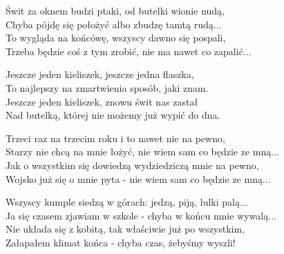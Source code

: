 \begin{text}
    Świt za oknem budzi ptaki, od butelki wionie nudą,\\
    Chyba pójdę się położyć albo zbudzę tamtą rudą...\\
    To wygląda na końcówę, wszyscy dawno się pospali,\\
    Trzeba będzie coś z tym zrobić, nie ma nawet co zapalić...

    \vin Jeszcze jeden kieliszek, jeszcze jedna flaszka,\\
    \vin To najlepszy na zmartwienia sposób, jaki znam.\\
    \vin Jeszcze jeden kieliszek, znowu świt nas zastał\\
    \vin Nad butelką, której nie możemy już wypić do dna.

    Trzeci raz na trzecim roku i to nawet nie na pewno,\\
    Starzy nie chcą na mnie łożyć, nie wiem sam co będzie ze mną...\\
    Jak o wszystkim się dowiedzą wydziedziczą mnie na pewno,\\
    Wojsko już się o mnie pyta - nie wiem sam co będzie ze mną...

    Wszyscy kumple siedzą w górach: jedzą, piją, lulki palą...\\
    Ja się czasem zjawiam w szkole - chyba w końcu mnie wywalą...\\
    Nie układa się z kobitą, tak właściwie już po wszystkim,\\
    Załapałem klimat końca - chyba czas, żebyśmy wyszli!
\end{text}
\begin{chord}

\end{chord}